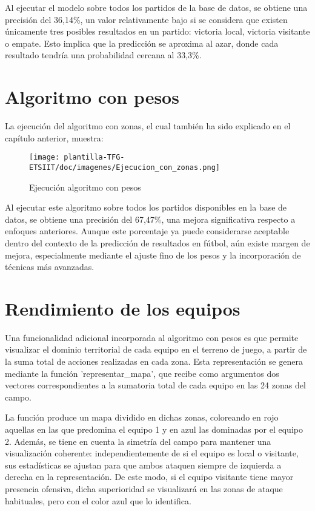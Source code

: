 Al ejecutar el modelo sobre todos los partidos de la base de datos, se obtiene una precisión del 36,14\%, un valor relativamente bajo si se considera que existen únicamente tres posibles resultados en un partido: victoria local, victoria visitante o empate. Esto implica que la predicción se aproxima al azar, donde cada resultado tendría una probabilidad cercana al 33,3\%.


\section{Algoritmo con pesos}
La ejecución del algoritmo con zonas, el cual también ha sido explicado en el capítulo anterior, muestra:

\begin{figure}[H]
    \centering
    \texttt{[image: plantilla-TFG-ETSIIT/doc/imagenes/Ejecucion\_con\_zonas.png]}
    \caption{Ejecución algoritmo con pesos}
    \label{fig:etiqueta-imagen}
\end{figure}

Al ejecutar este algoritmo sobre todos los partidos disponibles en la base de datos, se obtiene una precisión del 67,47\%, una mejora significativa respecto a enfoques anteriores. Aunque este porcentaje ya puede considerarse aceptable dentro del contexto de la predicción de resultados en fútbol, aún existe margen de mejora, especialmente mediante el ajuste fino de los pesos y la incorporación de técnicas más avanzadas.

\section{Rendimiento de los equipos}
Una funcionalidad adicional incorporada al algoritmo con pesos es que permite visualizar el dominio territorial de cada equipo en el terreno de juego, a partir de la suma total de acciones realizadas en cada zona. Esta representación se genera mediante la función 'representar\_mapa', que recibe como argumentos dos vectores correspondientes a la sumatoria total de cada equipo en las 24 zonas del campo.

La función produce un mapa dividido en dichas zonas, coloreando en rojo aquellas en las que predomina el equipo 1 y en azul las dominadas por el equipo 2. Además, se tiene en cuenta la simetría del campo para mantener una visualización coherente: independientemente de si el equipo es local o visitante, sus estadísticas se ajustan para que ambos ataquen siempre de izquierda a derecha en la representación. De este modo, si el equipo visitante tiene mayor presencia ofensiva, dicha superioridad se visualizará en las zonas de ataque habituales, pero con el color azul que lo identifica.

